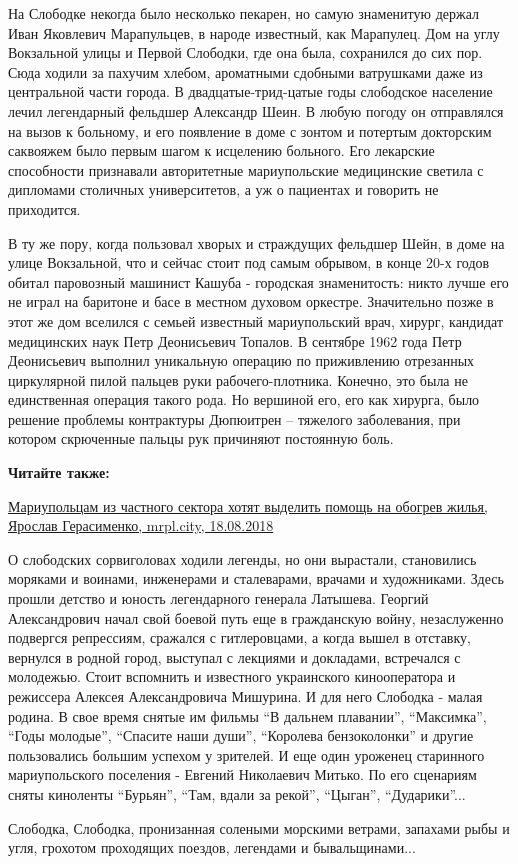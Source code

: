 На Слободке некогда было несколько пекарен, но самую знаменитую держал Иван
Яковлевич Марапульцев, в народе известный, как Марапулец. Дом на углу
Вокзальной улицы и Первой Слободки, где она была, сохранился до сих пор. Сюда
ходили за пахучим хлебом, ароматными сдобными ватрушками даже из центральной
части города. В двадцатые-трид\hyp{}цатые годы слободское население лечил легендарный
фельдшер Александр Шеин. В любую погоду он отправлялся на вызов к больному, и
его появление в доме с зонтом и потертым докторским саквояжем было первым шагом
к исцелению больного. Его лекарские способности признавали авторитетные
мариупольские медицинские светила с дипломами столичных университетов, а уж о
пациентах и говорить не приходится.

В ту же пору, когда пользовал хворых и страждущих фельдшер Шейн, в доме на
улице Вокзальной, что и сейчас стоит под самым обрывом, в конце 20-х годов
обитал паровозный машинист Кашуба - городская знаменитость: никто лучше его не
играл на баритоне и басе в местном духовом оркестре. Значительно позже в этот
же дом вселился с семьей известный мариупольский врач, хирург, кандидат
медицинских наук Петр Деонисьевич Топалов. В сентябре 1962 года Петр
Деонисьевич выполнил уникальную операцию по приживлению отрезанных циркулярной
пилой пальцев руки рабочего-плотника. Конечно, это была не единственная
операция такого рода. Но вершиной его, его как хирурга, было решение проблемы
контрактуры Дюпюитрен – тяжелого заболевания, при котором скрюченные пальцы рук
причиняют постоянную боль.

\textbf{Читайте также:} 

\href{https://mrpl.city/news/view/mariupoltsam-iz-chastnogo-sektora-hotyat-vydelit-pomoshh-na-obogrev-zhilya-foto}{%
Мариупольцам из частного сектора хотят выделить помощь на обогрев жилья, Ярослав Герасименко, mrpl.city, 18.08.2018}

О слободских сорвиголовах ходили легенды, но они вырастали, становились
моряками и воинами, инженерами и сталеварами, врачами и художниками. Здесь
прошли детство и юность легендарного генерала Латышева. Георгий Александрович
начал свой боевой путь еще в гражданскую войну, незаслуженно подвергся
репрессиям, сражался с гитлеровцами, а когда вышел в отставку, вернулся в
родной город, выступал с лекциями и докладами, встречался с молодежью. Стоит
вспомнить и известного украинского кинооператора и режиссера Алексея
Александровича Мишурина. И для него Слободка - малая родина. В свое время
снятые им фильмы \enquote{В дальнем плавании}, \enquote{Максимка},
\enquote{Годы молодые}, \enquote{Спасите наши души}, \enquote{Королева
бензоколонки} и другие пользовались большим успехом у зрителей. И еще один
уроженец старинного мариупольского поселения - Евгений Николаевич Митько. По
его сценариям сняты киноленты \enquote{Бурьян}, \enquote{Там, вдали за рекой},
\enquote{Цыган}, \enquote{Дударики}...

Слободка, Слободка, пронизанная солеными морскими ветрами, запахами рыбы и
угля, грохотом проходящих поездов, легендами и бывальщинами...
